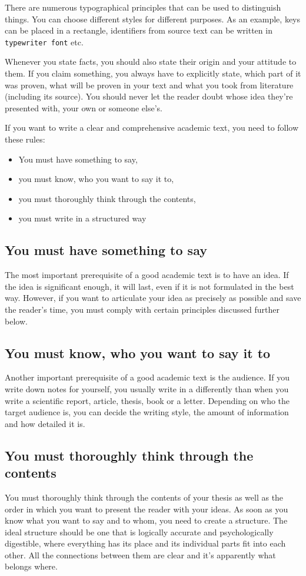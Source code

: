 There are numerous typographical principles that can be used to distinguish things. You can choose different styles for different purposes. As an example, keys can be placed in a rectangle, identifiers from source text can be written in {\tt typewriter font} etc.

Whenever you state facts, you should also state their origin and your attitude to them. If you claim something, you always have to explicitly state, which part of it was proven, what will be proven in your text and what you took from literature (including its source). You should never let the reader doubt whose idea they're presented with, your own or someone else's.


If you want to write a clear and comprehensive academic text, you need to follow these rules:
\begin{itemize}
\item You must have something to say,
\item you must know, who you want to say it to,
\item you must thoroughly think through the contents,
\item you must write in a structured way 
\end{itemize}

\subsection{You must have something to say}
The most important prerequisite of a good academic text is to have an idea. If the idea is significant enough, it will last, even if it is not formulated in the best way. However, if you want to articulate your idea as precisely as possible and save the reader's time, you must comply with certain principles discussed further below.

\subsection{You must know, who you want to say it to}
Another important prerequisite of a good academic text is the audience. If you write down notes for yourself, you usually write in a differently than when you write a scientific report, article, thesis, book or a letter. Depending on who the target audience is, you can decide the writing style, the amount of information and how detailed it is. 

\subsection{You must thoroughly think through the contents}
You must thoroughly think through the contents of your thesis as well as the order in which you want to present the reader with your ideas. As soon as you know what you want to say and to whom, you need to create a structure. The ideal structure should be one that is logically accurate and psychologically digestible, where everything has its place and its individual parts fit into each other. All the connections between them are clear and it's apparently what belongs where.

